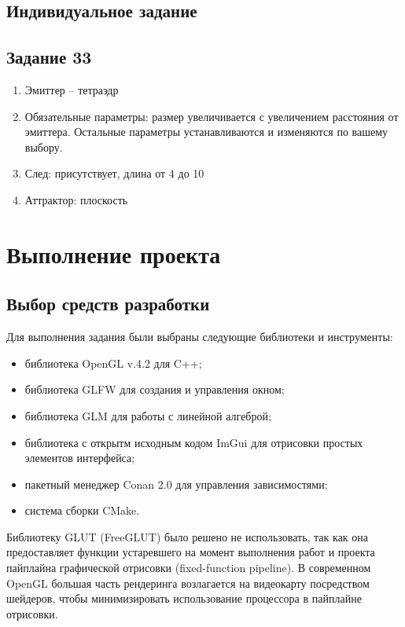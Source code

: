 \documentclass[a4paper,12pt]{article}
\begin{document}
\subsection{Индивидуальное задание}
\subsection*{Задание 33}
\begin{enumerate}
    \item Эмиттер – тетраэдр
    \item Обязательные параметры: размер увеличивается с увеличением расстояния от эмиттера.
          Остальные параметры устанавливаются и изменяются по вашему выбору.
    \item След: присутствует, длина от 4 до 10
    \item Аттрактор: плоскость
\end{enumerate}

\newpage

\section{Выполнение проекта}
\subsection{Выбор средств разработки}

Для выполнения задания были выбраны следующие библиотеки и инструменты:
\begin{itemize}
    \item библиотека OpenGL v.4.2 для C++;
    \item библиотека GLFW для создания и управления окном;
    \item библиотека GLM для работы с линейной алгеброй;
    \item библиотека с открытм исходным кодом ImGui для отрисовки простых элементов интерфейса;
    \item пакетный менеджер Conan 2.0 для управления зависимостями;
    \item система сборки CMake.
\end{itemize}
Библиотеку GLUT (FreeGLUT) было решено не использовать, так как она предоставляет функции устаревшего на
момент выполнения работ и проекта пайплайна графической отрисовки (fixed-function pipeline). В современном OpenGL большая часть рендеринга
возлагается на видеокарту посредством шейдеров, чтобы минимизировать использование процессора в пайплайне отрисовки.
\end{document}
